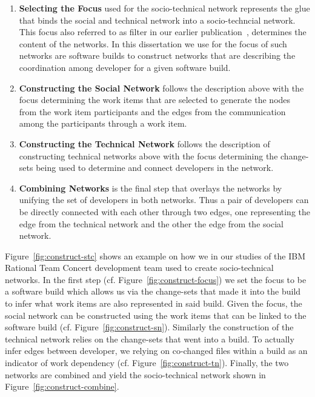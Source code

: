 \begin{enumerate}
\item\textbf{Selecting the Focus} used for the socio-technical network represents the glue that binds the social and technical network into a socio-techncial network. 
This focus also referred to as filter in our earlier publication~\cite{wolf:ieee:2009}, determines the content of the networks.
In this dissertation we use for the focus of such networks are software builds to construct networks that are describing the coordination among developer for a given software build.
\item\textbf{Constructing the Social Network} follows the description above with the focus determining the work items that are selected to generate the nodes from the work item participants and the edges from the communication among the participants through a work item.
\item\textbf{Constructing the Technical Network} follows the description of constructing technical networks above with the focus determining the change-sets being used to determine and connect developers in the network.
\item\textbf{Combining Networks} is the final step that overlays the networks by unifying the set of developers in both networks.
Thus a pair of developers can be directly connected with each other through two edges, one representing the edge from the technical network and the other the edge from the social network.
\end{enumerate}

Figure~\ref{fig:construct-stc} shows an example on how we in our studies of the IBM Rational Team Concert development team used to create socio-technical networks.
In the first step (cf. Figure~\ref{fig:construct-focus}) we set the focus to be a software build which allows us via the change-sets that made it into the build to infer what work items are also represented in said build.
Given the focus, the social network can be constructed using the work items that can be linked to the software build (cf. Figure~\ref{fig:construct-sn}).
Similarly the construction of the technical network relies on the change-sets that went into a build. 
To actually infer edges between developer, we relying on co-changed files within a build as an indicator of work dependency (cf. Figure~\ref{fig:construct-tn}).
Finally, the two networks are combined and yield the socio-technical network shown in Figure~\ref{fig:construct-combine}.


